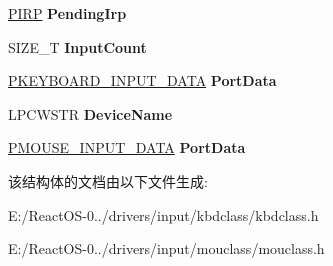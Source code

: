 \begin{DoxyCompactItemize}
\mbox{\label{struct___c_l_a_s_s___d_e_v_i_c_e___e_x_t_e_n_s_i_o_n_a979ce9336f34276de38c5f21b73d955b}} 
\hyperlink{interfacevoid}{P\+I\+RP} {\bfseries Pending\+Irp}
\item 
\mbox{\label{struct___c_l_a_s_s___d_e_v_i_c_e___e_x_t_e_n_s_i_o_n_ac41d3208a3789c57f21977c501210679}} 
S\+I\+Z\+E\+\_\+T {\bfseries Input\+Count}
\item 
\mbox{\label{struct___c_l_a_s_s___d_e_v_i_c_e___e_x_t_e_n_s_i_o_n_a62864ec8b32e3457b617bc12d3537006}} 
\hyperlink{struct___k_e_y_b_o_a_r_d___i_n_p_u_t___d_a_t_a}{P\+K\+E\+Y\+B\+O\+A\+R\+D\+\_\+\+I\+N\+P\+U\+T\+\_\+\+D\+A\+TA} {\bfseries Port\+Data}
\item 
\mbox{\label{struct___c_l_a_s_s___d_e_v_i_c_e___e_x_t_e_n_s_i_o_n_a42ec7bc0bb02bf8d203ed4a9ce6cf17d}} 
L\+P\+C\+W\+S\+TR {\bfseries Device\+Name}
\item 
\mbox{\label{struct___c_l_a_s_s___d_e_v_i_c_e___e_x_t_e_n_s_i_o_n_ac0b975acbf0ec63e9c78e935d726636e}} 
\hyperlink{struct___m_o_u_s_e___i_n_p_u_t___d_a_t_a}{P\+M\+O\+U\+S\+E\+\_\+\+I\+N\+P\+U\+T\+\_\+\+D\+A\+TA} {\bfseries Port\+Data}
\end{DoxyCompactItemize}


该结构体的文档由以下文件生成\+:\begin{DoxyCompactItemize}
\item 
E\+:/\+React\+O\+S-\/0../drivers/input/kbdclass/kbdclass.\+h\item 
E\+:/\+React\+O\+S-\/0../drivers/input/mouclass/mouclass.\+h\end{DoxyCompactItemize}
